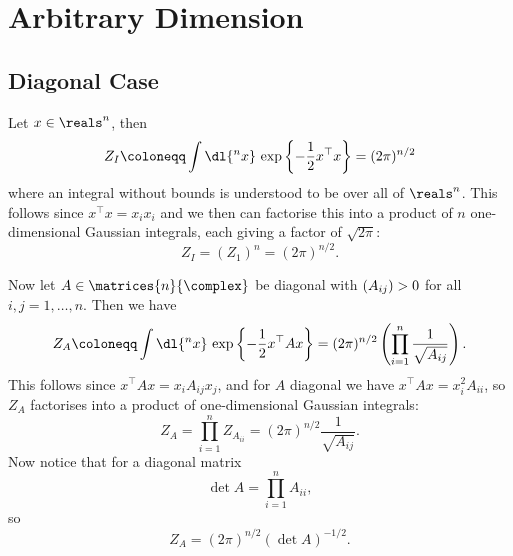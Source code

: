 \documentclass[fleqn]{NotesClass}
\let\Re\relax
\DeclareMathOperator{\Re}{Re}
\newcommand{\trans}{{\top}}
\begin{document}
    \section{Arbitrary Dimension}
    \subsection{Diagonal Case}
    Let \(x \in \reals^n\), then
    \begin{equation}
        Z_I \coloneqq \int \dl{^nx} \, \exp\left\{ -\frac{1}{2}x^\trans x \right\} = (2\pi)^{n/2}
    \end{equation}
    where an integral without bounds is understood to be over all of \(\reals^n\).
    This follows since \(x^\trans x = x_ix_i\) and we then can factorise this into a product of \(n\) one-dimensional Gaussian integrals, each giving a factor of \(\sqrt{2\pi}\):
    \begin{equation}
        Z_I = (Z_1)^n = (2\pi)^{n/2}.
    \end{equation}
    
    Now let \(A \in \matrices{n}{\complex}\) be diagonal with \(\Re(A_{ij}) > 0\) for all \(i, j = 1, \dotsc, n\).
    Then we have
    \begin{equation}
        Z_A \coloneqq \int \dl{^nx} \, \exp\left\{ -\frac{1}{2}x^\trans A x \right\} = (2\pi)^{n/2} \left( \prod_{i=1}^{n} \frac{1}{\sqrt{A_{ij}}} \right).
    \end{equation}
    This follows since \(x^\trans Ax = x_iA_{ij}x_j\), and for \(A\) diagonal we have \(x^\trans Ax = x_i^2A_{ii}\), so \(Z_A\) factorises into a product of one-dimensional Gaussian integrals:
    \begin{equation}
        Z_A = \prod_{i = 1}^{n} Z_{A_{ii}} = (2\pi)^{n/2} \frac{1}{\sqrt{A_{ij}}}.
    \end{equation}
    Now notice that for a diagonal matrix
    \begin{equation}
        \det A = \prod_{i = 1}^{n} A_{ii},
    \end{equation}
    so
    \begin{equation}
        Z_A = (2\pi)^{n/2} (\det A)^{-1/2}.
    \end{equation}
    
\end{document}

